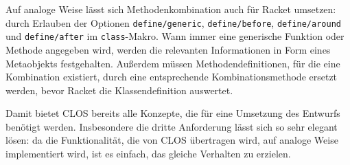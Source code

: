 Auf analoge Weise lässt sich Methodenkombination auch für Racket umsetzen: 
durch Erlauben der Optionen \texttt{define/generic}, \texttt{define/before}, \texttt{define/around} und \texttt{define/after} im \texttt{class}-Makro. Wann immer eine generische Funktion oder Methode angegeben wird, werden die relevanten Informationen in Form eines Metaobjekts festgehalten. Außerdem müssen Methodendefinitionen, für die eine Kombination existiert, durch eine entsprechende Kombinationsmethode ersetzt werden, bevor Racket die Klassendefinition auswertet.

Damit bietet CLOS bereits alle Konzepte, die für eine Umsetzung des Entwurfs benötigt werden. Insbesondere die dritte Anforderung lässt sich so sehr elegant lösen: da die Funktionalität, die von CLOS übertragen wird, auf analoge Weise implementiert wird, ist es einfach, das gleiche Verhalten zu erzielen.